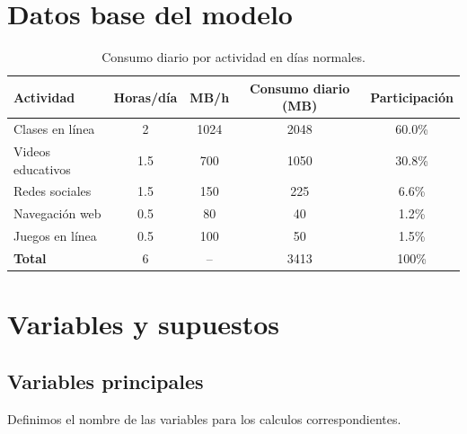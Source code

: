 \documentclass[12pt,a4paper]{article}
\begin{document}
	
	\section{Datos base del modelo}
	
	\begin{table}[H]
		\centering
		\renewcommand{\arraystretch}{1.3}
		\begin{tabular}{|p{4.5cm}|c|c|c|c|}
			\hline
			\rowcolor{azulclaro}
			\textbf{Actividad} & \textbf{Horas/día} & \textbf{MB/h} & \textbf{Consumo diario (MB)} & \textbf{Participación} \\ \hline
			Clases en línea & 2 & 1024 & 2048 & 60.0\% \\ \hline
			Videos educativos & 1.5 & 700 & 1050 & 30.8\% \\ \hline
			Redes sociales & 1.5 & 150 & 225 & 6.6\% \\ \hline
			Navegación web & 0.5 & 80 & 40 & 1.2\% \\ \hline
			Juegos en línea & 0.5 & 100 & 50 & 1.5\% \\ \hline
			\rowcolor{gris}
			\textbf{Total} & 6 & -- & 3413 & 100\% \\ \hline
		\end{tabular}
		\caption{Consumo diario por actividad en días normales.}
	\end{table}
	
	\section{Variables y supuestos}
	
	\subsection{Variables principales}
	Definimos el nombre de las variables para los calculos correspondientes.
	
\end{document}
